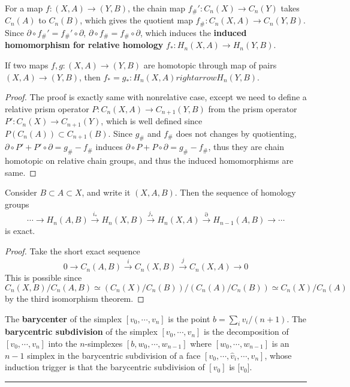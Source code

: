 \begin{defn} For a map $f:(X,A)\rightarrow (Y,B)$, the chain map $f_\#':C_n(X)\rightarrow C_n(Y)$ takes $C_n(A)$ to $C_n(B)$, which gives the quotient map $f_\#:C_n(X,A)\rightarrow C_n(Y,B)$. Since $\partial\circ f_\#'=f_\#'\circ \partial$, $\partial \circ f_\#=f_\#\circ \partial$, which induces the \textbf{induced homomorphism for relative homology} $f_*:H_n(X,A)\rightarrow H_n(Y,B)$. 
\end{defn}

\begin{prop} If two maps $f,g:(X,A)\rightarrow (Y,B)$ are homotopic through map of pairs $(X,A)\rightarrow (Y,B)$, then $f_*=g_*:H_n(X,A)rightarrow H_n(Y,B)$.
\end{prop}
\begin{proof} The proof is exactly same with nonrelative case, except we need to define a relative prism operator $P:C_n(X,A)\rightarrow C_{n+1}(Y,B)$ from the prism operator $P':C_n(X)\rightarrow C_{n+1}(Y)$, which is well defined since $P(C_n(A))\subset C_{n+1}(B)$. Since $g_\#$ and $f_\#$ does not changes by quotienting, $\partial \circ P'+P'\circ \partial=g_\#-f_\#$ induces $\partial \circ P+P\circ \partial=g_\#-f_\#$, thus they are chain homotopic on relative chain groups, and thus the induced homomorphisms are same.
\end{proof}

\begin{prop} Consider $B\subset A\subset X$, and write it $(X,A,B)$. Then the sequence of homology groups
\begin{equation}
\cdots\rightarrow H_n(A,B)\xrightarrow{i_*} H_n(X,B)\xrightarrow{j_*} H_n(X,A)\xrightarrow{\partial} H_{n-1}(A,B)\rightarrow\cdots
\end{equation}
is exact.
\end{prop}
\begin{proof}
Take the short exact sequence
\begin{equation}
0\rightarrow C_n(A,B)\xrightarrow{i} C_n(X,B)\xrightarrow{j} C_n(X,A)\rightarrow 0
\end{equation}
This is possible since $C_n(X,B)/C_n(A,B)\simeq (C_n(X)/C_n(B))/(C_n(A)/C_n(B))\simeq C_n(X)/C_n(A)$ by the third isomorphism theorem.
\end{proof}

\begin{defn} The \textbf{barycenter} of the simplex $[v_0,\cdots,v_n]$ is the point $b=\sum_i v_i/(n+1)$. The \textbf{barycentric subdivision} of the simplex $[v_0,\cdots,v_n]$ is the decomposition of $[v_0,\cdots,v_n]$ into the $n$-simplexes $[b,w_0,\cdots,w_{n-1}]$ where $[w_0,\cdots,w_{n-1}]$ is an $n-1$ simplex in the barycentric subdivision of a face $[v_0,\cdots,\hat{v}_i,\cdots,v_n]$, whose induction trigger is that the barycentric subdivision of $[v_0]$ is [$v_0]$.
\end{defn}
\noindent\rule{\textwidth}{1pt}
\newline